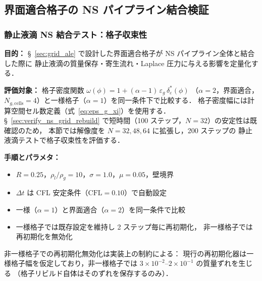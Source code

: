 %
\subsection{界面適合格子の NS パイプライン結合検証}
\label{sec:nonuniform_grid_ns}

\subsubsection{静止液滴 NS 結合テスト：格子収束性}
\label{sec:nonuniform_ns_static_droplet}

\noindent\textbf{目的：}
§~\ref{sec:grid_ale} で設計した界面適合格子が NS パイプライン全体と結合した際に
静止液滴の質量保存・寄生流れ・Laplace 圧力に与える影響を定量化する．

\noindent\textbf{評価対象：}
格子密度関数 $\omega(\phi) = 1 + (\alpha{-}1)\,\varepsilon_g\,\delta_\varepsilon^*(\phi)$
（$\alpha = 2$，界面適合，$N_{g,\text{cells}} = 4$）と一様格子（$\alpha = 1$）を同一条件下で比較する．
格子密度幅には計算空間セル数定義（式~\eqref{eq:eps_g_xi}）を使用する．
§~\ref{sec:verify_ns_grid_rebuild} で短時間（100 ステップ，$N{=}32$）の安定性は既確認のため，
本節では解像度を $N = 32, 48, 64$ に拡張し，200 ステップの
静止液滴テストで格子収束性を評価する．

\noindent\textbf{手順とパラメタ：}
\begin{itemize}[noitemsep]
  \item $R = 0.25$，$\rho_l/\rho_g = 10$，$\sigma = 1.0$，$\mu = 0.05$，壁境界
  \item $\Delta t$ は CFL 安定条件（$\mathrm{CFL} = 0.10$）で自動設定
  \item 一様（$\alpha = 1$）と界面適合（$\alpha = 2$）を同一条件で比較
  \item 一様格子では既存設定を維持し 2 ステップ毎に再初期化，
        非一様格子では再初期化を無効化
\end{itemize}

\noindent
非一様格子での再初期化無効化は実装上の制約による：
現行の再初期化器は一様格子幅を仮定しており，非一様格子では
$3\times10^{-2}$--$2\times10^{-1}$ の質量ずれを生じる
（格子リビルド自体はそのずれを保存するのみ）．


